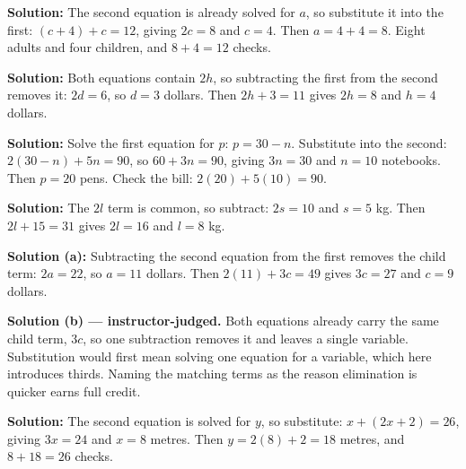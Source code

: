 \documentclass[12pt]{article}
\begin{document}




\textbf{Solution:} The second equation is already solved for $a$, so
substitute it into the first: $(c + 4) + c = 12$, giving $2c = 8$ and $c = 4$.
Then $a = 4 + 4 = 8$. Eight adults and four children, and $8 + 4 = 12$ checks.


\textbf{Solution:} Both equations contain $2h$, so subtracting the first from
the second removes it: $2d = 6$, so $d = 3$ dollars. Then $2h + 3 = 11$ gives
$2h = 8$ and $h = 4$ dollars. 


\textbf{Solution:} Solve the first equation for $p$: $p = 30 - n$. Substitute
into the second: $2(30 - n) + 5n = 90$, so $60 + 3n = 90$, giving $3n = 30$
and $n = 10$ notebooks. Then $p = 20$ pens. Check the bill:
$2(20) + 5(10) = 90$. 


\textbf{Solution:} The $2l$ term is common, so subtract: $2s = 10$ and
$s = 5$ kg. Then $2l + 15 = 31$ gives $2l = 16$ and $l = 8$ kg.


\textbf{Solution (a):} Subtracting the second equation from the first removes
the child term: $2a = 22$, so $a = 11$ dollars. Then $2(11) + 3c = 49$ gives
$3c = 27$ and $c = 9$ dollars. 

\textbf{Solution (b) --- instructor-judged.} Both equations already carry the
same child term, $3c$, so one subtraction removes it and leaves a single
variable. Substitution would first mean solving one equation for a variable,
which here introduces thirds. Naming the matching terms as the reason
elimination is quicker earns full credit.


\textbf{Solution:} The second equation is solved for $y$, so substitute:
$x + (2x + 2) = 26$, giving $3x = 24$ and $x = 8$ metres. Then
$y = 2(8) + 2 = 18$ metres, and $8 + 18 = 26$ checks. 
\end{document}
